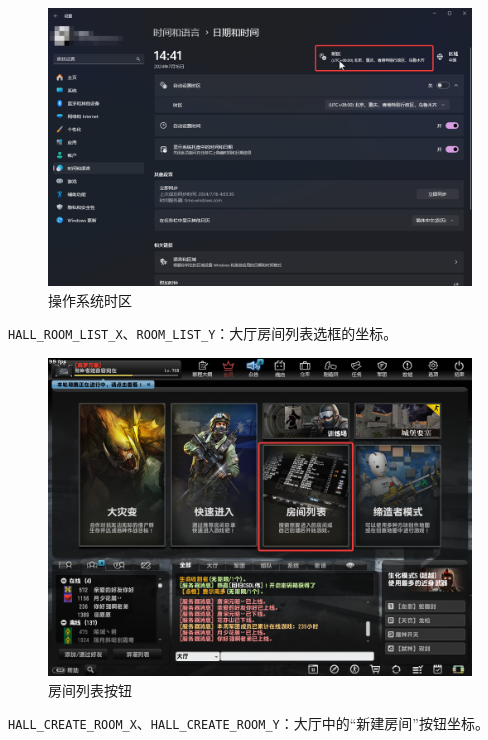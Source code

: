 \begin{figure}[H]
    \Centering
    \includegraphics[width=\textwidth]{docs/assets/timezone.png}
    \caption{操作系统时区}
\end{figure}

\lstinline{HALL_ROOM_LIST_X}、\lstinline{ROOM_LIST_Y}：大厅房间列表选框的坐标。

\begin{figure}[H]
    \Centering
    \includegraphics[width=\textwidth]{docs/assets/room_list.png}
    \caption{房间列表按钮}
\end{figure}

\lstinline{HALL_CREATE_ROOM_X}、\lstinline{HALL_CREATE_ROOM_Y}：大厅中的“新建房间”按钮坐标。


